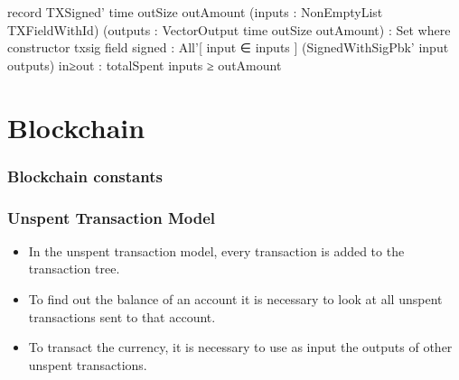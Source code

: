 \documentclass{beamer}
\begin{document}
\begin{frame}
\begin{code}

    record TXSigned'
      {time} {outSize} {outAmount}
      (inputs    : NonEmptyList TXFieldWithId)
      (outputs   : VectorOutput time outSize outAmount)
        : Set where
      constructor txsig
      field
        signed   : All'[ input ∈ inputs ]
          (SignedWithSigPbk' input outputs)
        in≥out : totalSpent inputs ≥ outAmount

\end{code}
\end{frame}

\section{Blockchain}

\begin{frame}
  \frametitle{Blockchain constants}
\end{frame}

\begin{frame}
   \frametitle{Unspent Transaction Model}
   \begin{itemize}
     \item In the unspent transaction model, every transaction is added to the transaction tree.
     \item To find out the balance of an account it is necessary to look at all unspent transactions
       sent to that account.
     \item To transact the currency, it is necessary to use as input the outputs of
       other unspent transactions.
   \end{itemize}
\end{frame}
\end{document}
